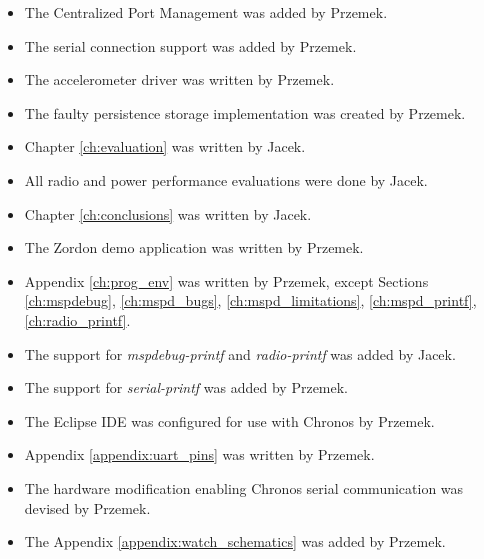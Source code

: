 \begin{itemize}
  \item The Centralized Port Management was added by Przemek.
  \item The serial connection support was added by Przemek.
  \item The accelerometer driver was written by Przemek.
  \item The faulty persistence storage implementation was created by Przemek.
  \item Chapter \ref{ch:evaluation} was written by Jacek.
  \item All radio and power performance evaluations were done by Jacek.
  \item Chapter \ref{ch:conclusions} was written by Jacek.
  \item The Zordon demo application was written by Przemek.
  \item Appendix \ref{ch:prog_env} was written by Przemek, except Sections \ref{ch:mspdebug}, \ref{ch:mspd_bugs}, \ref{ch:mspd_limitations}, \ref{ch:mspd_printf}, \ref{ch:radio_printf}.
  \item The support for \emph{mspdebug-printf} and \emph{radio-printf} was added by Jacek.
  \item The support for \emph{serial-printf} was added by Przemek.
  \item The Eclipse IDE was configured for use with Chronos by Przemek.
  \item Appendix \ref{appendix:uart_pins} was written by Przemek.
  \item The hardware modification enabling Chronos serial communication was devised by Przemek.
  \item The Appendix \ref{appendix:watch_schematics} was added by Przemek.
\end{itemize}




